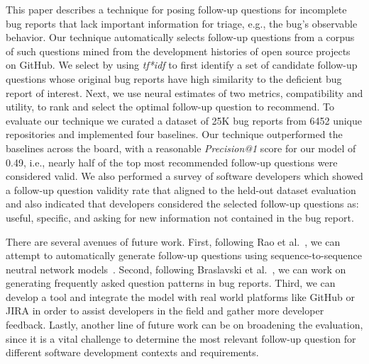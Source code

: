 This paper describes a technique for posing follow-up questions for incomplete bug reports that lack important information for triage, e.g., the bug's observable behavior. Our technique automatically selects follow-up questions from a corpus of such questions mined from the development histories of open source projects on GitHub. We select by using {\em tf*idf} to first identify a set of candidate follow-up questions whose original bug reports have high similarity to the deficient bug report of interest. Next, we use neural estimates of two metrics, compatibility and utility, to rank and select the optimal follow-up question to recommend. To evaluate our technique we curated a dataset of 25K bug reports from 6452 unique repositories and implemented four baselines. Our technique outperformed the baselines across the board, with a reasonable {\em Precision@1} score for our model of 0.49, i.e., nearly half of the top most recommended follow-up questions were considered valid. We also performed a survey of software developers which showed a follow-up question validity rate that aligned to the held-out dataset evaluation and also indicated that developers considered the selected follow-up questions as: useful, specific, and asking for new information not contained in the bug report.

There are several avenues of future work. First, following Rao et al.~\cite{rao2019answer}, we can attempt to automatically generate follow-up questions using sequence-to-sequence neutral network models~\cite{sutskever2014sequence, yin2015neural, serban2015building}. Second, following Braslavski et al.~\cite{10.1145/3020165.3022149}, we can work on generating frequently asked question patterns in bug reports. Third, we can develop a tool and integrate the \evpi model with real world platforms like GitHub or JIRA in order to assist developers in the field and gather more developer feedback. Lastly, another line of future work can be on broadening the evaluation, since it is a vital challenge to determine the most relevant follow-up question for different software development contexts and requirements.
